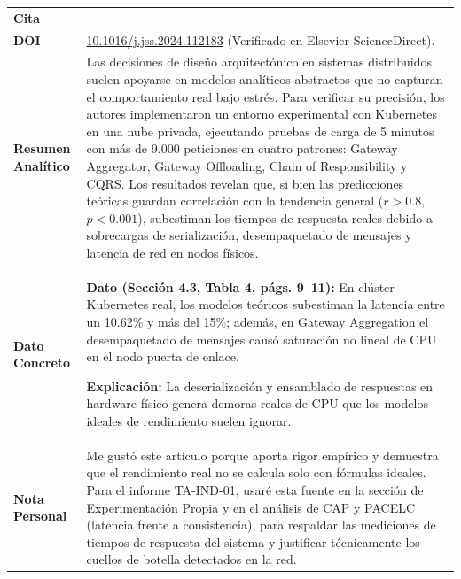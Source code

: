 \documentclass[11pt,a4paper]{article}
\begin{document}
\noindent
\renewcommand{\arraystretch}{1.2}
\begin{tabularx}{\textwidth}{|>{\raggedright\arraybackslash}p{3.2cm}|X|}
\hline
\multicolumn{2}{|c|}{\bfseries FICHA DE LECTURA N.° 3: RENDIMIENTO EXPERIMENTAL} \\
\hline
\textbf{Cita} & \parbox{\dimexpr\linewidth-6pt\relax}{\raggedright\vspace{2pt}\vspace{2pt}} \\
\hline
\textbf{DOI} & \href{https://doi.org/10.1016/j.jss.2024.112183}{10.1016/j.jss.2024.112183} (Verificado en Elsevier ScienceDirect). \\
\hline
\textbf{Resumen Analítico} & Las decisiones de diseño arquitectónico en sistemas distribuidos suelen apoyarse en modelos analíticos abstractos que no capturan el comportamiento real bajo estrés. Para verificar su precisión, los autores implementaron un entorno experimental con Kubernetes en una nube privada, ejecutando pruebas de carga de 5 minutos con más de 9.000 peticiones en cuatro patrones: Gateway Aggregator, Gateway Offloading, Chain of Responsibility y CQRS. Los resultados revelan que, si bien las predicciones teóricas guardan correlación con la tendencia general ($r > 0.8$, $p < 0.001$), subestiman los tiempos de respuesta reales debido a sobrecargas de serialización, desempaquetado de mensajes y latencia de red en nodos físicos. \\
\hline
\textbf{Dato Concreto} & \textbf{Dato (Sección 4.3, Tabla 4, págs. 9--11):} En clúster Kubernetes real, los modelos teóricos subestiman la latencia entre un 10.62\% y más del 15\%; además, en Gateway Aggregation el desempaquetado de mensajes causó saturación no lineal de CPU en el nodo puerta de enlace. \par\vspace{0.2em}
\textbf{Explicación:} La deserialización y ensamblado de respuestas en hardware físico genera demoras reales de CPU que los modelos ideales de rendimiento suelen ignorar. \\
\hline
\textbf{Nota Personal} & Me gustó este artículo porque aporta rigor empírico y demuestra que el rendimiento real no se calcula solo con fórmulas ideales. Para el informe TA-IND-01, usaré esta fuente en la sección de Experimentación Propia y en el análisis de CAP y PACELC (latencia frente a consistencia), para respaldar las mediciones de tiempos de respuesta del sistema y justificar técnicamente los cuellos de botella detectados en la red. \\
\hline
\end{tabularx}
\end{document}

